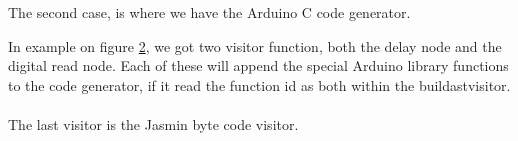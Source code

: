 \begin{figure}[H]
\centering
{}
\label{io01}
\end{figure}
The second case, is where we have the Arduino C code generator.
\begin{figure}[H]
\centering
{}
\label{io02}
\end{figure}
In example on figure \ref{io02}, we got two visitor function, both the delay node and the digital read node. Each of these will append the special Arduino library functions to the code generator, if it read the function id as both within the buildastvisitor. \\
\\
The last visitor is the Jasmin byte code visitor.\\
\begin{figure}[H]
\centering
{}
\label{io03}
\end{figure}

